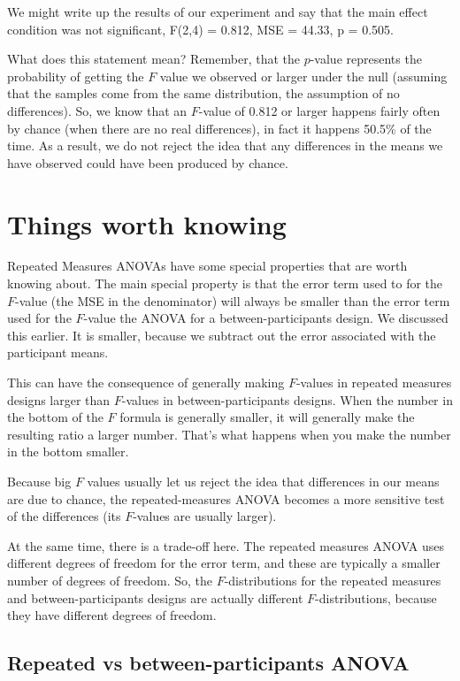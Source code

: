 \documentclass[
]{book}
\begin{document}
We might write up the results of our experiment and say that the main effect condition was not significant, F(2,4) = 0.812, MSE = 44.33, p = 0.505.

What does this statement mean? Remember, that the \(p\)-value represents the probability of getting the \(F\) value we observed or larger under the null (assuming that the samples come from the same distribution, the assumption of no differences). So, we know that an \(F\)-value of 0.812 or larger happens fairly often by chance (when there are no real differences), in fact it happens 50.5\% of the time. As a result, we do not reject the idea that any differences in the means we have observed could have been produced by chance.

\section{Things worth knowing}\label{things-worth-knowing}

Repeated Measures ANOVAs have some special properties that are worth knowing about. The main special property is that the error term used to for the \(F\)-value (the MSE in the denominator) will always be smaller than the error term used for the \(F\)-value the ANOVA for a between-participants design. We discussed this earlier. It is smaller, because we subtract out the error associated with the participant means.

This can have the consequence of generally making \(F\)-values in repeated measures designs larger than \(F\)-values in between-participants designs. When the number in the bottom of the \(F\) formula is generally smaller, it will generally make the resulting ratio a larger number. That's what happens when you make the number in the bottom smaller.

Because big \(F\) values usually let us reject the idea that differences in our means are due to chance, the repeated-measures ANOVA becomes a more sensitive test of the differences (its \(F\)-values are usually larger).

At the same time, there is a trade-off here. The repeated measures ANOVA uses different degrees of freedom for the error term, and these are typically a smaller number of degrees of freedom. So, the \(F\)-distributions for the repeated measures and between-participants designs are actually different \(F\)-distributions, because they have different degrees of freedom.

\subsection{Repeated vs between-participants ANOVA}\label{repeated-vs-between-participants-anova}
\end{document}
